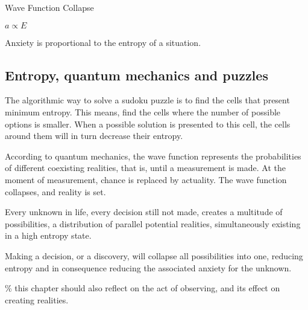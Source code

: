 
\begin{center}
\vspace*{\fill}
\Huge Wave Function Collapse

\vspace{2cm}

\begin{flushright}
\large
\textit{ $a \propto E$ }
\end{flushright}
\vspace*{\fill}
\end{center}

\normalsize


Anxiety is proportional to the entropy of a situation. 

\subsection*{ Entropy, quantum mechanics and puzzles} 

The algorithmic way to solve a sudoku puzzle is to find the cells 
that present minimum entropy. 
This means, find the cells where the number of possible options is smaller.
When a possible solution is presented to this cell, the cells around them will 
in turn decrease their entropy. 

According to quantum mechanics, the wave function represents the probabilities 
of different coexisting realities, that is, until a 
measurement is made. At the moment of measurement, chance is replaced by 
actuality. The wave function collapses, and reality is set.

Every unknown in life, every decision still not made, creates a multitude of 
possibilities, a distribution of parallel potential realities, simultaneously 
existing in a high entropy state. 

Making a decision, or a discovery, will collapse all possibilities into one, 
reducing entropy and in consequence reducing the associated anxiety for the unknown. 

{\scriptsize \textcolor{comment}{\%  this chapter should also reflect on the act of observing, and its effect on creating realities. }}




